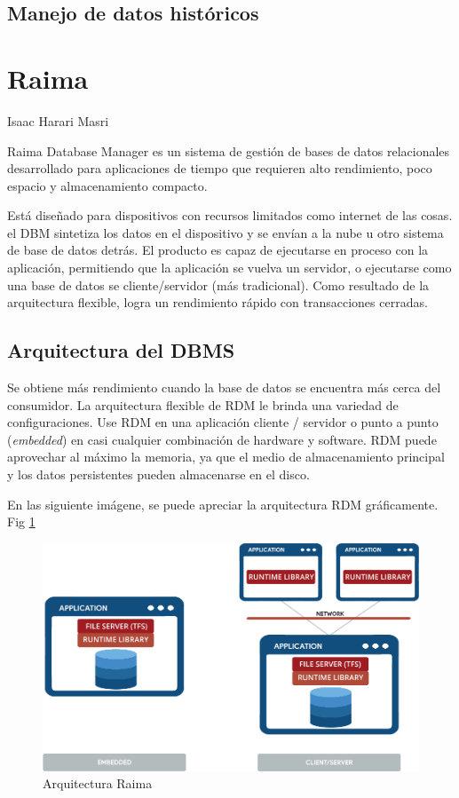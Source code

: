 \documentclass{acmart}
\begin{document}
\subsection{Manejo de datos históricos}

\newpage

\section{Raima}
Isaac Harari Masri

Raima Database Manager es un sistema de gestión de bases de datos relacionales desarrollado para aplicaciones de tiempo que requieren alto rendimiento, poco espacio y almacenamiento compacto.

Está diseñado para dispositivos con recursos limitados como internet de las cosas. el DBM sintetiza los datos en el dispositivo y se envían a la nube u otro sistema de base de datos detrás. El producto es capaz de ejecutarse en proceso con la aplicación, permitiendo que la aplicación se vuelva un servidor, o ejecutarse como una base de datos se cliente/servidor (más tradicional). Como resultado de la arquitectura flexible, logra un rendimiento rápido con transacciones cerradas.
\subsection{Arquitectura del DBMS}
Se obtiene más rendimiento cuando la base de datos se encuentra más cerca del consumidor. La arquitectura flexible de RDM le brinda una variedad de configuraciones. Use RDM en una aplicación cliente / servidor o punto a punto (\textit{embedded}) en casi cualquier combinación de hardware y software. RDM puede aprovechar al máximo la memoria, ya que el medio de almacenamiento principal y los datos persistentes pueden almacenarse en el disco. \cite{Rpdf1, Rarch}

En las siguiente imágene, se puede apreciar la arquitectura RDM gráficamente. Fig \ref{arqRaima}

\begin{figure}
	\includegraphics[width=\linewidth]{arq_1.png} %
	\caption{Arquitectura Raima} %
	\label{arqRaima} %
\end{figure}
\end{document}
